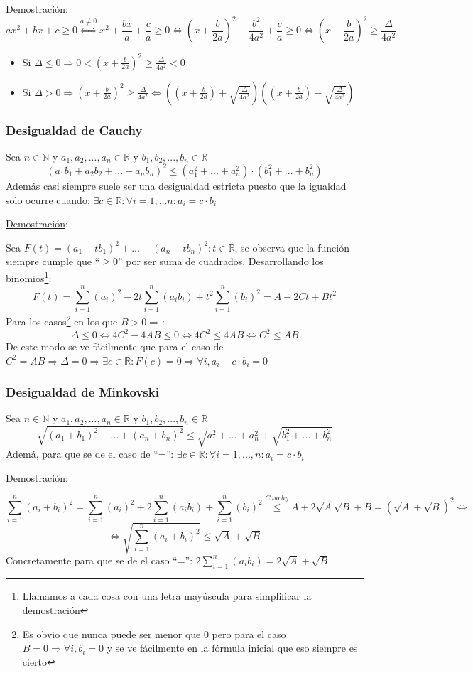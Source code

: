 \documentclass[10pt,a4paper,openright]{book}
\begin{document}
\underline{Demostración}:
$$ax^2+bx+c\geq 0\stackrel{a\neq 0}{\Leftrightarrow} x^2+\frac{bx}{a}+\frac{c}{a}\geq 0\Leftrightarrow (x+\frac{b}{2a})^2-\frac{b^2}{4a^2}+\frac{c}{a}\geq 0\Leftrightarrow (x+\frac{b}{2a})^2\geq \frac{\Delta}{4a^2}$$
\begin{itemize}
\item Si $\Delta\leq 0\Rightarrow 0<(x+\frac{b}{2a})^2 \geq \frac{\Delta}{4a^2}<0$
\item Si $\Delta>0\Rightarrow (x+\frac{b}{2a})^2 \geq \frac{\Delta}{4a^2}\Leftrightarrow \left((x+\frac{b}{2a})+\sqrt{\frac{\Delta}{4a^2}}\right)\left((x+\frac{b}{2a})-\sqrt{\frac{\Delta}{4a^2}}\right)$
\end{itemize}

\subsubsection*{Desigualdad de Cauchy}
Sea $n\in \mathbb N$ y $a_1, a_2, ..., a_n\in \mathbb R$ y $b_1, b_2, ..., b_n\in \mathbb R$
$$(a_1b_1+a_2b_2+...+a_nb_n)^2 \leq (a_1^2+...+a_n^2)\cdot (b_1^2+...+b_n^2)$$
Además casi siempre suele ser una desigualdad estricta puesto que la igualdad solo ocurre cuando: $\exists c\in \mathbb R : \forall i=1,...n :a_i=c\cdot b_i$\par
\underline{Demostración}:\par
Sea $F(t)=(a_1-tb_1)^2+...+(a_n-tb_n)^2 : t\in \mathbb R$, se observa que la función siempre cumple que ``$\geq 0$'' por ser suma de cuadrados. Desarrollando los binomios\footnote{Llamamos a cada cosa con una letra mayúscula para simplificar la demostración}:
$$F(t)=\sum_{i=1}^n (a_i)^2 -2t\sum_{i=1}^n (a_ib_i) + t^2\sum_{i=1}^n (b_i)^2=A-2Ct+Bt^2$$
Para los casos\footnote{Es obvio que nunca puede ser menor que 0 pero para el caso $B=0\Rightarrow \forall i, b_i=0$ y se ve fácilmente en la fórmula inicial que eso siempre es cierto} en los que $B>0\Rightarrow$:
$$\Delta\leq 0\Leftrightarrow 4C^2-4AB\leq 0\Leftrightarrow 4C^2\leq 4AB\Leftrightarrow C^2\leq AB$$
De este modo se ve fácilmente que para el caso de $C^2=AB\Rightarrow \Delta=0\Rightarrow \exists c\in \mathbb R : F(c)=0\Rightarrow \forall  i, a_i-c\cdot b_i=0$

\subsubsection*{Desigualdad de Minkovski}
Sea $n\in \mathbb N$ y $a_1, a_2, ..., a_n\in \mathbb R$ y $b_1, b_2, ..., b_n\in \mathbb R$
$$\sqrt{(a_1+b_1)^2+...+(a_n+b_n)^2}\leq \sqrt{a_1^2+...+a_n^2}+\sqrt{b_1^2+...+b_n^2}$$
Ademá, para que se de el caso de ``='': $\exists c\in \mathbb R : \forall i=1,...,n : a_i=c\cdot b_i$\par
\underline{Demostración}:\par
$$\sum_{i=1}^n (a_i+b_i)^2=\sum_{i=1}^n (a_i)^2+2\sum_{i=1}^n (a_ib_i)+ \sum_{i=1}^n (b_i)^2\stackrel{Cauchy}{\leq}A+2\sqrt{A}\sqrt{B}+B=(\sqrt{A}+\sqrt{B})^2\Leftrightarrow$$
$$\Leftrightarrow \sqrt{\sum_{i=1}^n (a_i+b_i)^2}\leq \sqrt{A}+\sqrt{B}$$
Concretamente para que se de el caso ``='': $2\sum_{i=1}^n (a_ib_i)=2\sqrt{A}+\sqrt{B}$
\end{document}
